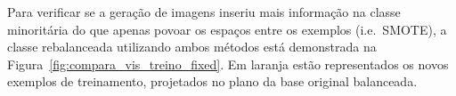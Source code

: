 \begin{itemize}


Para verificar se a geração de imagens inseriu mais informação na classe minoritária do que apenas povoar os espaços entre os exemplos (i.e.\ SMOTE), a classe rebalanceada utilizando ambos métodos está demonstrada na Figura~\ref{fig:compara_vis_treino_fixed}. Em laranja estão representados os novos exemplos de treinamento, projetados no plano da base original balanceada.


\end{itemize}
